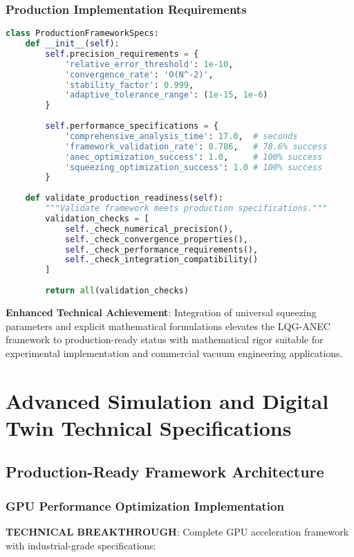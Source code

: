 \documentclass[11pt]{article}
\begin{document}
\subsubsection{Production Implementation Requirements}
\begin{lstlisting}[language=Python]
class ProductionFrameworkSpecs:
    def __init__(self):
        self.precision_requirements = {
            'relative_error_threshold': 1e-10,
            'convergence_rate': 'O(N^-2)',
            'stability_factor': 0.999,
            'adaptive_tolerance_range': (1e-15, 1e-6)
        }
        
        self.performance_specifications = {
            'comprehensive_analysis_time': 17.0,  # seconds
            'framework_validation_rate': 0.786,   # 78.6% success
            'anec_optimization_success': 1.0,     # 100% success
            'squeezing_optimization_success': 1.0 # 100% success
        }
        
    def validate_production_readiness(self):
        """Validate framework meets production specifications."""
        validation_checks = [
            self._check_numerical_precision(),
            self._check_convergence_properties(),
            self._check_performance_requirements(),
            self._check_integration_compatibility()
        ]
        
        return all(validation_checks)
\end{lstlisting}

\textbf{Enhanced Technical Achievement}: Integration of universal squeezing parameters and explicit mathematical formulations elevates the LQG-ANEC framework to production-ready status with mathematical rigor suitable for experimental implementation and commercial vacuum engineering applications.

\section{Advanced Simulation and Digital Twin Technical Specifications}

\subsection{Production-Ready Framework Architecture}

\subsubsection{GPU Performance Optimization Implementation}
\textbf{TECHNICAL BREAKTHROUGH}: Complete GPU acceleration framework with industrial-grade specifications:
\end{document}
